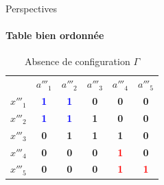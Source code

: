 \documentclass{beamer}
\begin{document}
  \begin{frame}{Perspectives}
  \framesubtitle{Table bien ordonnée}
	\begin{table}[htb]
	  \centering

	\begin{tabular}{lccccc}
	& $a'''_1$ & $a'''_2$ & $a'''_3$ & $a'''_4$ & $a'''_5$\\
	$x'''_1$ & \textcolor{blue}{\textbf{1}} & \textcolor{blue}{\textbf{1}} & \textbf{0} & \textbf{0} & \textbf{0}\\
	$x'''_2$ & \textcolor{blue}{\textbf{1}} & \textcolor{blue}{\textbf{1}} & \textbf{1} & \textbf{0} & \textbf{0}\\
	$x'''_3$ & \textbf{0} & \textbf{1} & \textbf{1} & \textbf{1} & \textbf{0}\\
	$x'''_4$ & \textbf{0} & \textbf{0} & \textbf{0} & \textcolor{red}{\textbf{1}} & \textbf{0}\\
	$x'''_5$ & \textbf{0} & \textbf{0} & \textbf{0} & \textcolor{red}{\textbf{1}} & \textcolor{red}{\textbf{1}}
	\end{tabular}
   \caption{Absence de configuration $\Gamma$}
	\end{table}
  \end{frame}




  
\end{document}
